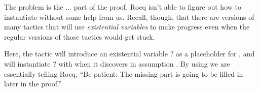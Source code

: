 \documentclass[12pt]{report}
\begin{document}
The problem is the   ... part of the proof.  Rocq
    isn't able to figure out how to instantiate  without some help
    from us.  Recall, though, that there are versions of many tactics
    that will use \textit{existential variables} to make progress even when
    the regular versions of those tactics would get stuck.


    Here, the  tactic will introduce an existential variable
    ? as a placeholder for , and  will
    instantiate ? with  when it discovers  in assumption
    .  By using  we are essentially telling Rocq, ``Be
    patient: The missing part is going to be filled in later in the
    proof.'' 
\end{document}
